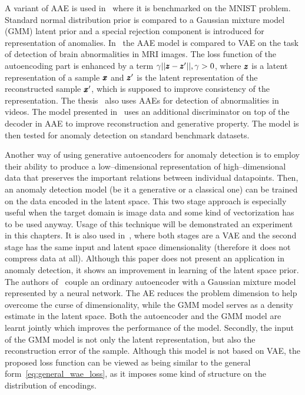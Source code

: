 A variant of AAE is used in~\cite{leveau2017adversarial} where it is benchmarked on the MNIST problem. Standard normal distribution prior is compared to a Gaussian mixture model (GMM) latent prior and a special rejection component is introduced for representation of anomalies. In~\cite{chen2018unsupervised} the AAE model is compared to VAE on the task of detection of brain abnormalities in MRI images. The loss function of the autoencoding part is enhanced by a term $\gamma||\pmb{{z}}-\pmb{{z}}'||, \gamma > 0$, where $\pmb{{z}}$ is a latent representation of a sample $\pmb{{x}}$ and $\pmb{{z}}'$ is the latent representation of the reconstructed sample $\pmb{{x}}'$, which is supposed to improve consistency of the representation. The thesis~\cite{dimokranitou2017adversarial} also uses AAEs for detection of abnormalities in videos. The model presented in~\cite{pidhorskyi2018generative} uses an additional discriminator on top of the decoder in AAE to improve reconstruction and generative property. The model is then tested for anomaly detection on standard benchmark datasets.

Another way of using generative autoencoders for anomaly detection is to employ their ability to produce a low--dimensional representation of high--dimensional data that preserves the important relations between individual datapoints. Then, an anomaly detection model (be it a generative or a classical one) can be trained on the data encoded in the latent space. This two stage approach is especially useful when the target domain is image data and some kind of vectorization has to be used anyway. Usage of this technique will be demonstrated an experiment in this chapters. It is also used in~\cite{dai2019diagnosing}, where both stages are a VAE and the second stage has the same input and latent space dimensionality (therefore it does not compress data at all). Although this paper does not present an application in anomaly detection, it shows an improvement in learning of the latent space prior. The authors of~\cite{zong2018deep} couple an ordinary autoencoder with a Gaussian mixture model represented by a neural network. The AE reduces the problem dimension to help overcome the curse of dimensionality, while the GMM model serves as a density estimate in the latent space. Both the autoencoder and the GMM model are learnt jointly which improves the performance of the model. Secondly, the input of the GMM model is not only the latent representation,
but also the reconstruction error of the sample. Although this model is not based on VAE, the proposed loss function can be viewed as being similar to the general form~\eqref{eq:general_wae_loss}, as it imposes some kind of structure on the distribution of encodings.

